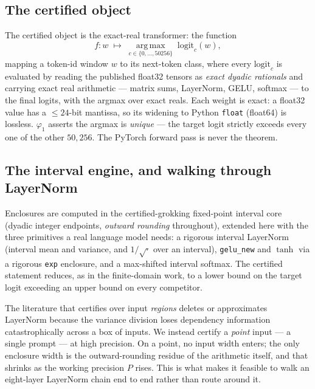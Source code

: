 \documentclass[11pt,a4paper]{article}
\begin{document}
\subsection{The certified object}

The certified object is the exact-real transformer: the function
\[
f\colon w \;\longmapsto\; \operatorname*{arg\,max}_{c \in \{0,\dots,50256\}} \; \mathrm{logit}_c(w),
\]
mapping a token-id window \(w\) to its next-token class, where every \(\mathrm{logit}_c\) is evaluated by reading the published float32 tensors as \emph{exact dyadic rationals} and carrying exact real arithmetic --- matrix sums, LayerNorm, GELU, softmax --- to the final logits, with the argmax over exact reals. Each weight is exact: a float32 value has a \(\le 24\)-bit mantissa, so its widening to Python \texttt{float} (float64) is lossless. \(\varphi_1\) asserts the argmax is \emph{unique} --- the target logit strictly exceeds every one of the other \(50{,}256\). The PyTorch forward pass is never the theorem.

\subsection{The interval engine, and walking through LayerNorm}

Enclosures are computed in the certified-grokking fixed-point interval core (dyadic integer endpoints, \emph{outward rounding} throughout), extended here with the three primitives a real language model needs: a rigorous interval LayerNorm (interval mean and variance, and \(1/\sqrt{\cdot}\) over an interval), \texttt{gelu\_new} and \(\tanh\) via a rigorous \texttt{exp} enclosure, and a max-shifted interval softmax. The certified statement reduces, as in the finite-domain work, to a lower bound on the target logit exceeding an upper bound on every competitor.

The literature that certifies over input \emph{regions} deletes or approximates LayerNorm because the variance division loses dependency information catastrophically across a box of inputs. We instead certify a \emph{point} input --- a single prompt --- at high precision. On a point, no input width enters; the only enclosure width is the outward-rounding residue of the arithmetic itself, and that shrinks as the working precision \(P\) rises. This is what makes it feasible to walk an eight-layer LayerNorm chain end to end rather than route around it.
\end{document}
